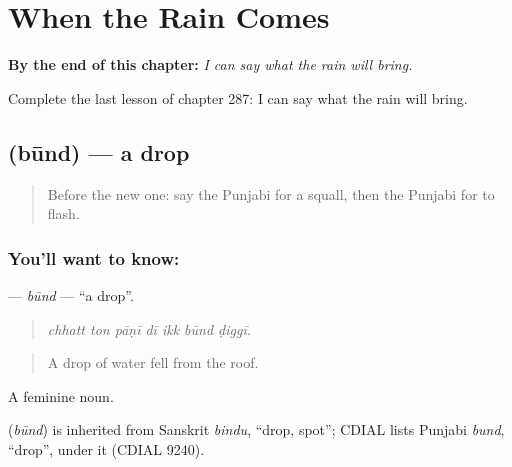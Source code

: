 
\chapter{When the Rain Comes}
\label{ch:pa-a2-when-the-rain-comes}

\begin{chapteropening}
\textbf{By the end of this chapter:} \emph{I can say what the rain will bring.}

Complete the last lesson of chapter 287: I can say what the rain will bring.
\end{chapteropening}

\section[\texorpdfstring{\pa{ਬੂੰਦ} (būnd)}{ਬੂੰਦ (būnd)}]{ (būnd) — a drop}

\label{lesson:PA-C287-bund}



\begin{quote}
Before the new one: say the Punjabi for a squall, then the Punjabi for to flash.
\end{quote}

\subsection*{You'll want to know: }
\textbf{} — \emph{būnd} — \textquotedblleft{}a drop\textquotedblright{}.

\begin{quote}
      
\end{quote}

\begin{quote}
\emph{chhatt ton pāṇī dī ikk būnd ḍiggī.}
\end{quote}

\begin{quote}
A drop of water fell from the roof.
\end{quote}

A feminine noun.

\begin{cousinweb}
\textbf{} (\emph{būnd}) is inherited from Sanskrit \emph{bindu}, \textquotedblleft{}drop, spot\textquotedblright{}; CDIAL lists Punjabi \emph{bund}, \textquotedblleft{}drop\textquotedblright{}, under it (CDIAL 9240).
\end{cousinweb}

